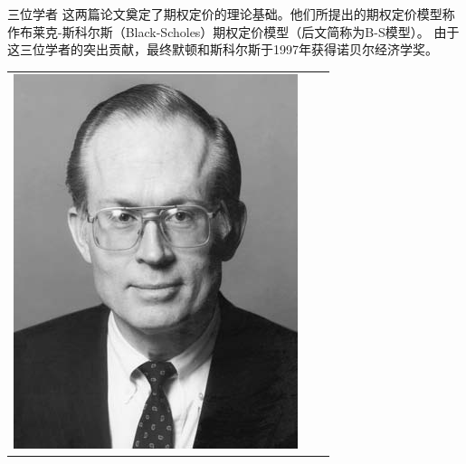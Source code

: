 \documentclass[t]{beamer}
\begin{document}
\begin{frame}{三位学者}
	这两篇论文奠定了期权定价的理论基础。他们所提出的期权定价模型称作布莱克-斯科尔斯（Black-Scholes）期权定价模型（后文简称为B-S模型）。
	由于这三位学者的突出贡献，最终默顿和斯科尔斯于1997年获得诺贝尔经济学奖。
\begin{center}
\begin{tabular}{ccc}
\includegraphics[height=0.4\textheight]{fig/black.jpg}

\end{tabular}
\end{center}
\end{frame}
\end{document}
